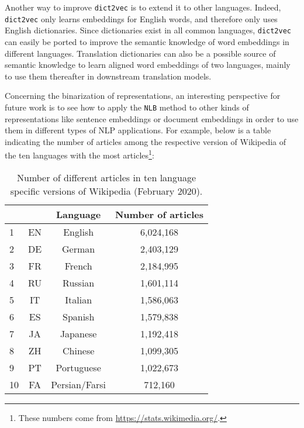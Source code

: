   Another way to improve \texttt{dict2vec} is to extend it to other languages.
  Indeed, \texttt{dict2vec} only learns embeddings for English words, and
  therefore only uses English dictionaries. Since dictionaries exist in all
  common languages, \texttt{dict2vec} can easily be ported to improve the
  semantic knowledge of word embeddings in different languages. Translation
  dictionaries can also be a possible source of semantic knowledge to learn
  aligned word embeddings of two languages, mainly to use them thereafter in
  downstream translation models. \bigskip


  Concerning the binarization of representations, an interesting perspective for
  future work is to see how to apply the \texttt{NLB} method to other kinds of
  representations like sentence embeddings or document embeddings in order to
  use them in different types of NLP applications. For example, below is a table
  indicating the number of articles among the respective version of Wikipedia of
  the ten languages with the most articles\footnote{These numbers come from
  \url{https://stats.wikimedia.org/}.}:

  \begin{table}[h]
    \centering
    \begin{tabular}{lccc}
      \toprule[0.15em]
          &    & Language      &  Number of articles\\
      \midrule
        1 & EN & English       &          6,024,168 \\
        2 & DE & German        &          2,403,129 \\
        3 & FR & French        &          2,184,995 \\
        4 & RU & Russian       &          1,601,114 \\
        5 & IT & Italian       &          1,586,063 \\
        6 & ES & Spanish       &          1,579,838 \\
        7 & JA & Japanese      &          1,192,418 \\
        8 & ZH & Chinese       &          1,099,305 \\
        9 & PT & Portuguese    &          1,022,673 \\
        10& FA & Persian/Farsi &            712,160 \\
      \bottomrule[0.15em]
    \end{tabular}
    \captionsetup[table]{list=no}
    \caption*{Number of different articles in ten language specific versions of
    Wikipedia (February 2020).}
  \end{table}

